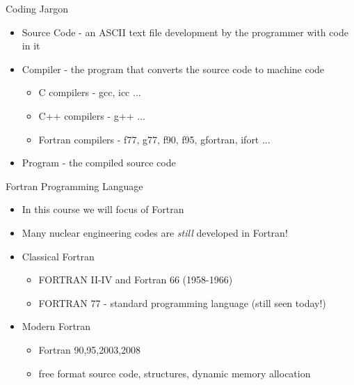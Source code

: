 \documentclass{beamer}
\begin{document}
\begin{frame}{Coding Jargon}

\begin{itemize} 

  \item Source Code - an ASCII text file development by the programmer with code in it
  \vfill\item Compiler - the program that converts the source code to machine code
  \begin{itemize}
   \item C compilers - gcc, icc ...
   \item C++ compilers - g++ ...
   \item Fortran compilers - f77, g77, f90, f95, gfortran, ifort ...
  \end{itemize}
  \vfill\item Program - the compiled source code

\end{itemize}
\end{frame}
\begin{frame}{Fortran Programming Language}

  \begin{itemize}
    \item In this course we will focus of Fortran
    \item Many nuclear engineering codes are \emph{still} developed in Fortran!

    \vfill\item Classical Fortran
      \begin{itemize}
	\item FORTRAN II-IV and Fortran 66 (1958-1966)
	\item FORTRAN 77 - standard programming language (still seen today!)
      \end{itemize}

    \vfill\item \alert{Modern Fortran}
    \begin{itemize}
      \item Fortran 90,95,2003,2008
      \item free format source code, structures, dynamic memory allocation
    \end{itemize}

  \end{itemize}
\end{frame}
\end{document}
